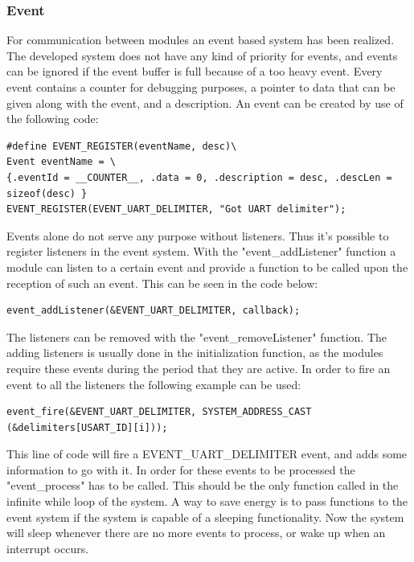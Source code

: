 \subsubsection{Event}
For communication between modules an event based system has been realized. The developed system does not have any kind of priority for events, and events can be ignored if the event buffer is full because of a too heavy event. Every event contains a counter for debugging purposes, a pointer to data that can be given along with the event, and a description. An event can be created by use of the following code:
\begin{verbatim}
#define EVENT_REGISTER(eventName, desc)\
Event eventName = \
{.eventId = __COUNTER__, .data = 0, .description = desc, .descLen = sizeof(desc) }
EVENT_REGISTER(EVENT_UART_DELIMITER, "Got UART delimiter");
\end{verbatim}
Events alone do not serve any purpose without listeners. Thus it's possible to register listeners in the event system. With the "event\_addListener" function a module can listen to a certain event and provide a function to be called upon the reception of such an event. This can be seen in the code below:
\begin{verbatim}
event_addListener(&EVENT_UART_DELIMITER, callback);
\end{verbatim}
The listeners can be removed with the "event\_removeListener" function. The adding listeners is usually done in the initialization function, as the modules require these events during the period that they are active. In order to fire an event to all the listeners the following example can be used: 
\begin{verbatim}
event_fire(&EVENT_UART_DELIMITER, SYSTEM_ADDRESS_CAST (&delimiters[USART_ID][i]));
\end{verbatim}
This line of code will fire a EVENT\_UART\_DELIMITER event, and adds some information to go with it.\newpar
In order for these events to be processed the "event\_process" has to be called. This should be the only function called in the infinite while loop of the system. A way to save energy is to pass functions to the event system if the system is capable of a sleeping functionality. Now the system will sleep whenever there are no more events to process, or wake up when an interrupt occurs.

